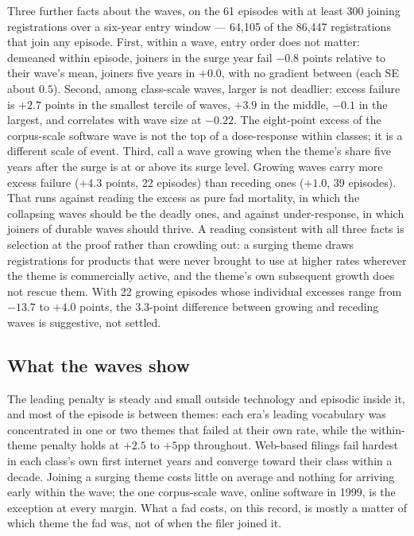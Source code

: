 Three further facts about the waves, on the 61 episodes with at least 300
joining registrations over a six-year entry window --- 64{,}105 of the
86{,}447 registrations that join any episode. First, within a wave, entry
order does not matter: demeaned within episode, joiners in the surge year
fail $-0.8$ points relative to their wave's mean, joiners five years in
$+0.0$, with no gradient between (each SE about $0.5$). Second, among
class-scale waves, larger is not deadlier: excess failure is $+2.7$
points in the smallest tercile of waves, $+3.9$ in the middle, $-0.1$ in
the largest, and correlates with wave size at $-0.22$. The eight-point
excess of the corpus-scale software wave is not the top of a
dose-response within classes; it is a different scale of event. Third,
call a wave growing when the theme's share five years after the surge is
at or above its surge level. Growing waves carry more excess failure
($+4.3$ points, 22 episodes) than receding ones ($+1.0$, 39 episodes).
That runs against reading the excess as pure fad mortality, in which the
collapsing waves should be the deadly ones, and against under-response,
in which joiners of durable waves should thrive. A reading consistent
with all three facts is selection at the proof rather than crowding out:
a surging theme draws registrations for products that were never brought
to use at higher rates wherever the theme is commercially active, and the
theme's own subsequent growth does not rescue them. With 22 growing
episodes whose individual excesses range from $-13.7$ to $+4.0$ points,
the $3.3$-point difference between growing and receding waves is
suggestive, not settled.

\subsection{What the waves show}\label{sec:waves_conclusion}

The leading penalty is steady and small outside technology and episodic
inside it, and most of the episode is between themes: each era's leading
vocabulary was concentrated in one or two themes that failed at their own
rate, while the within-theme penalty holds at $+2.5$ to $+5$pp
throughout. Web-based filings fail hardest in each class's own first
internet years and converge toward their class within a decade. Joining a
surging theme costs little on average and nothing for arriving early
within the wave; the one corpus-scale wave, online software in 1999, is
the exception at every margin. What a fad costs, on this record, is
mostly a matter of which theme the fad was, not of when the filer joined
it.
